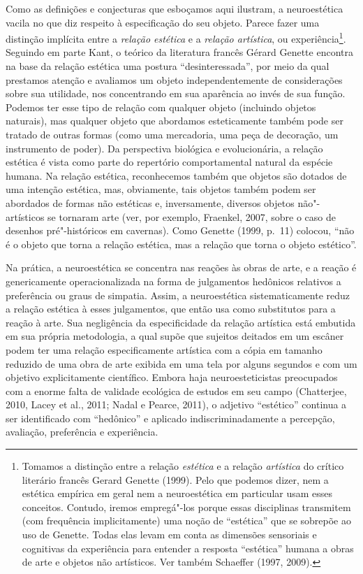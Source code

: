 Como as definições e conjecturas que esboçamos aqui ilustram, a
neuroestética vacila no que diz respeito à especificação do seu objeto.
Parece fazer uma distinção implícita entre a \emph{relação estética} e a
\emph{relação artística}, ou experiência\footnote[18]{Tomamos a distinção entre a relação \emph{estética} e a relação
\emph{artística} do crítico literário francês Gerard Genette (1999).
Pelo que podemos dizer, nem a estética empírica em geral nem a
neuroestética em particular usam esses conceitos. Contudo, iremos
empregá"-los porque essas disciplinas transmitem (com frequência
implicitamente) uma noção de ``estética'' que se sobrepõe ao uso de
Genette. Todas elas levam em conta as dimensões sensoriais e cognitivas
da experiência para entender a resposta ``estética'' humana a obras de
arte e objetos não artísticos. Ver também Schaeffer (1997, 2009).}. Seguindo
em parte Kant, o teórico da literatura francês Gérard Genette encontra
na base da relação estética uma postura ``desinteressada'', por meio da
qual prestamos atenção e avaliamos um objeto independentemente de
considerações sobre sua utilidade, nos concentrando em sua aparência ao
invés de sua função. Podemos ter esse tipo de relação com qualquer
objeto (incluindo objetos naturais), mas qualquer objeto que abordamos
esteticamente também pode ser tratado de outras formas (como uma
mercadoria, uma peça de decoração, um instrumento de poder). Da
perspectiva biológica e evolucionária, a relação estética é vista como
parte do repertório comportamental natural da espécie humana. Na relação
estética, reconhecemos também que objetos são dotados de uma intenção
estética, mas, obviamente, tais objetos também podem ser abordados de
formas não estéticas e, inversamente, diversos objetos não"-artísticos se
tornaram arte (ver, por exemplo, Fraenkel, 2007, sobre o caso de
desenhos pré"-históricos em cavernas). Como Genette (1999, p.~11) colocou,
``não é o objeto que torna a relação estética, mas a relação que torna o
objeto estético''.

Na prática, a neuroestética se concentra nas reações às obras de arte, e
a reação é genericamente operacionalizada na forma de julgamentos
hedônicos relativos a preferência ou graus de simpatia. Assim, a
neuroestética sistematicamente reduz a relação estética à esses
julgamentos, que então usa como substitutos para a reação à arte. Sua
negligência da especificidade da relação artística está embutida em sua
própria metodologia, a qual supõe que sujeitos deitados em um escâner
podem ter uma relação especificamente artística com a cópia em tamanho
reduzido de uma obra de arte exibida em uma tela por alguns segundos e
com um objetivo explicitamente científico. Embora haja neuroesteticistas
preocupados com a enorme falta de validade ecológica de estudos em seu
campo (Chatterjee, 2010, Lacey et al., 2011; Nadal e Pearce, 2011), o
adjetivo ``estético'' continua a ser identificado com ``hedônico'' e
aplicado indiscriminadamente a percepção, avaliação, preferência e
experiência.

